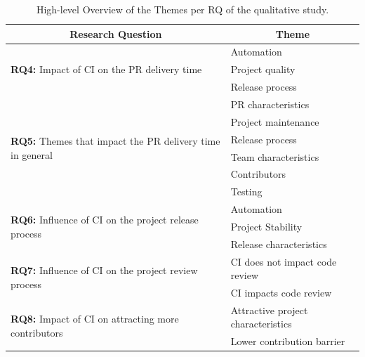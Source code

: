 \begin{table}
	\centering
	\caption{High-level Overview of the Themes per RQ of the qualitative study.}
    \begin{tabular}{cp{15em}}
    \hline
    \textbf{Research Question} & \multicolumn{1}{c}{\textbf{Theme}} \bigstrut\\
    \hline
    \multicolumn{1}{l}{\multirow{3}[6]{*}{\textbf{RQ4:} Impact of CI on the PR delivery time}} & \multicolumn{1}{l}{Automation} \bigstrut\\
    \cline{2-2}          & \multicolumn{1}{l}{Project quality} \bigstrut\\
    \cline{2-2}          & Release process \bigstrut\\
    \hline
    \multicolumn{1}{l}{\multirow{6}[13]{*}{\textbf{RQ5:} Themes that impact the PR delivery time in general}} & \multicolumn{1}{l}{PR characteristics} \bigstrut\\
\cline{2-2}          & \multicolumn{1}{l}{Project maintenance} \bigstrut\\
\cline{2-2}          & \multicolumn{1}{l}{Release process} \bigstrut\\
\cline{2-2}          & \multicolumn{1}{l}{Team characteristics} \bigstrut\\
\cline{2-2}          & \multicolumn{1}{l}{Contributors} \bigstrut\\
\cline{2-2}          & \multicolumn{1}{l}{Testing} \bigstrut\\
    \hline
    \multicolumn{1}{l}{\multirow{3}[6]{*}{\textbf{RQ6:} Influence of CI on the project release process}} & Automation \bigstrut\\
\cline{2-2}          & Project Stability \bigstrut\\
\cline{2-2}          & Release characteristics \bigstrut\\
    \hline
    \multicolumn{1}{l}{\multirow{2}[4]{*}{\textbf{RQ7:} Influence of CI on the project review process}} & CI does not impact code review \bigstrut\\
\cline{2-2}          & CI impacts code review \bigstrut\\
    \hline
    \multicolumn{1}{l}{\multirow{2}[4]{*}{\textbf{RQ8:} Impact of CI on attracting more contributors}} & Attractive project characteristics \bigstrut\\
\cline{2-2}          & Lower contribution barrier \bigstrut\\
    \hline
    \end{tabular}%
  \label{tab:themes_per_research_question}%
\end{table}%